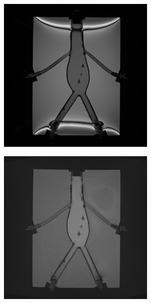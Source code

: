 \documentclass{article}
\begin{document}
\begin{figure}[h]
    \centering
    \begin{minipage}{0.45\textwidth}
        \centering
        \includegraphics[width=\textwidth]{img/bssfp-example.jpg}
        \subcaption{}
        \label{fig:bssfp-example}
    \end{minipage}\hfill
    \begin{minipage}{0.45\textwidth}
        \centering
        \includegraphics[width=\textwidth]{img/gre-example.jpg}

\end{minipage}
\end{figure}
\end{document}
